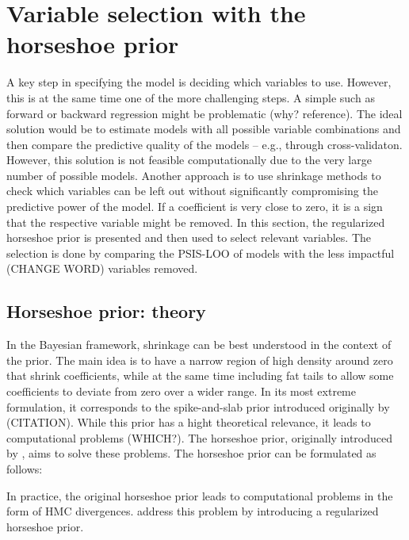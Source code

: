\section{Variable selection with the horseshoe prior}

A key step in specifying the model is deciding which variables to use.
However, this is at the same time one of the more challenging steps.
A simple such as forward or backward regression might be problematic (why? reference).
The ideal solution would be to estimate models with all possible variable combinations and then compare the predictive quality of the models – e.g., through cross-validaton.
However, this solution is not feasible computationally due to the very large number of possible models.
Another approach is to use shrinkage methods to check which variables can be left out without significantly compromising the predictive power of the model.
If a coefficient is very close to zero, it is a sign that the respective variable might be removed.
In this section, the regularized horseshoe prior \citep{piironen_sparsity_2017} is presented and then used to select relevant variables. The selection is done by comparing the PSIS-LOO of models with the less impactful (CHANGE WORD) variables removed.

\subsection{Horseshoe prior: theory}

In the Bayesian framework, shrinkage can be best understood in the context of the prior.
The main idea is to have a narrow region of high density around zero that shrink coefficients,
while at the same time including fat tails to allow some coefficients to deviate from zero over a wider range.
In its most extreme formulation, it corresponds to the spike-and-slab prior introduced originally by (CITATION).
While this prior has a hight theoretical relevance, it leads to computational problems (WHICH?).
The horseshoe prior, originally introduced by \cite{carvalho_horseshoe_2010}, aims to solve these problems.
The horseshoe prior can be formulated as follows:

In practice, the original horseshoe prior leads to computational problems in the form of HMC divergences.
 \cite{piironen_sparsity_2017} address this problem by introducing a regularized horseshoe prior.

